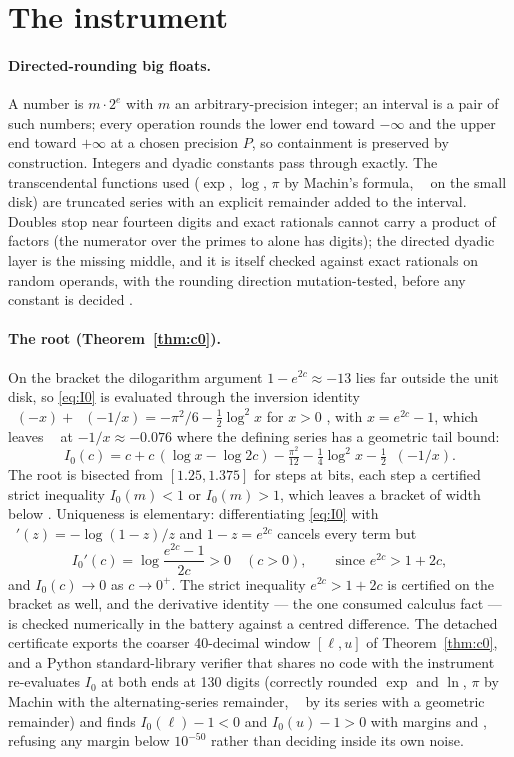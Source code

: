\documentclass[11pt]{article}
\DeclareMathOperator{\Li}{Li_2}
\theoremstyle{definition}\newtheorem{observation}{Observation}
\begin{document}
\section{The instrument}\label{sec:instrument}

\paragraph{Directed-rounding big floats.} A number is $m\cdot2^e$ with $m$ an arbitrary-precision integer; an interval is a pair of such numbers; every operation rounds the lower end toward $-\infty$ and the upper end toward $+\infty$ at a chosen precision $P$, so containment is preserved by construction. Integers and dyadic constants pass through exactly. The transcendental functions used ($\exp$, $\log$, $\pi$ by Machin's formula, $\Li$ on the small disk) are truncated series with an explicit remainder added to the interval. Doubles stop near fourteen digits and exact rationals cannot carry a product of \CstarPrimes{} factors (the numerator over the primes to \RefLimit{} alone has \RefNumDigits{} digits); the directed dyadic layer is the missing middle, and it is itself checked against exact rationals on random operands, with the rounding direction mutation-tested, before any constant is decided \cite{Repo}.

\paragraph{The root (Theorem~\ref{thm:c0}).} On the bracket the dilogarithm argument $1-e^{2c}\approx-13$ lies far outside the unit disk, so \eqref{eq:I0} is evaluated through the inversion identity $\Li(-x)+\Li(-1/x)=-\pi^2/6-\tfrac12\log^2x$ for $x>0$ \cite[eq.~(1.12)]{Lewin81}, with $x=e^{2c}-1$, which leaves $\Li$ at $-1/x\approx-0.076$ where the defining series has a geometric tail bound:
\[
I_0(c)=c+c\,(\log x-\log 2c)-\tfrac{\pi^2}{12}-\tfrac14\log^2x-\tfrac12\Li(-1/x).
\]
The root is bisected from $[1.25,1.375]$ for \CzeroBisections{} steps at \CzeroBits{} bits, each step a certified strict inequality $I_0(m)<1$ or $I_0(m)>1$, which leaves a bracket of width below \CzeroWidthBound. Uniqueness is elementary: differentiating \eqref{eq:I0} with $\Li'(z)=-\log(1-z)/z$ and $1-z=e^{2c}$ cancels every term but
\[
I_0'(c)=\log\frac{e^{2c}-1}{2c}>0\quad(c>0),\qquad\text{since } e^{2c}>1+2c ,
\]
and $I_0(c)\to0$ as $c\to0^+$. The strict inequality $e^{2c}>1+2c$ is certified on the bracket as well, and the derivative identity --- the one consumed calculus fact --- is checked numerically in the battery against a centred difference. The detached certificate exports the coarser 40-decimal window $[\ell,u]$ of Theorem~\ref{thm:c0}, and a Python standard-library verifier that shares no code with the instrument re-evaluates $I_0$ at both ends at 130 digits (correctly rounded $\exp$ and $\ln$, $\pi$ by Machin with the alternating-series remainder, $\Li$ by its series with a geometric remainder) and finds $I_0(\ell)-1<0$ and $I_0(u)-1>0$ with margins \CzeroMarginLo{} and \CzeroMarginHi, refusing any margin below $10^{-50}$ rather than deciding inside its own noise.
\end{document}
